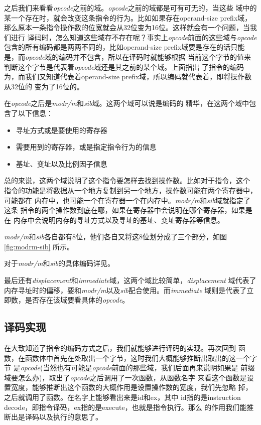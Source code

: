 之后我们来看看\emph{opcode}之前的域。\emph{opcode}之前的域都是可有可无的，当这些
域中的某一个存在时，就会改变这条指令的行为。比如如果存在operand-size prefix域，
那么原本一条指令操作数的位宽就会从32位变为16位。这样就会有一个问题，当我们进行
译码时，怎么知道这些域存不存在呢？事实上\emph{opcode}前面的这些域与\emph{opcode}
包含的所有编码都是两两不同的，比如operand-size prefix域要是存在的话只能
是，而\emph{opcode}域的编码并不包含，所以在译码时就能够根据
当前这个字节的值来判断这个字节是代表着\emph{opcode}域还是其之前的某个域。上面指出
了指令的编码为，而我们又知道代表着operand-size
prefix域，所以编码就代表着，即将操作数从32位的
变为了16位的。

在\emph{opcode}之后是\emph{modr/m}和\emph{sib}域。这两个域可以说是\arch 编码的
精华，在这两个域中包含了以下信息：
\begin{itemize}
  \item 寻址方式或是要使用的寄存器
  \item 需要用到的寄存器，或是指定指令行为的信息
  \item 基址、变址以及比例因子信息
\end{itemize}

总的来说，这两个域说明了这个指令要怎样去找到操作数。比如对于指令，这个
指令的功能是将数据从一个地方复制到另一个地方，操作数可能在两个寄存器中，可能都在
内存中，也可能一个在寄存器一个在内存中。\emph{modr/m}和\emph{sib}域就指定了这条
指令的两个操作数到底在哪，如果在寄存器中会说明在哪个寄存器，如果是在
内存中会说明内存的寻址方式以及寻址的基址、变址寄存器等信息。

\emph{modr/m}和\emph{sib}各自都有8位，他们各自又将这8位划分成了三个部分，如图\ref{fig:modrm-sib}
所示。


对于\emph{modr/m}和\emph{sib}的具体编码详见\cite{i386-manual}。

最后还有\emph{displacement}和\emph{immediate}域，这两个域比较简单，\emph{displacement}
域代表了内存寻址时的偏移，要和\emph{modr/m}以及\emph{sib}配合使用。而\emph{immediate}
域则是代表了立即数，是否存在该域要看具体的\emph{opcode}。

\subsection{\arch 译码实现}
在大致知道了\arch 指令的编码方式之后，我们就能够进行译码的实现。再次回到
函数，在函数体中首先在\pc 处取出一个字节，这时我们大概能够推断出取出的这一个字节
是\emph{opcode}(当然也有可能是\emph{opcode}前面的那些域，我们后面再来说明如果是
前缀域要怎么办)，取出了\emph{opcode}之后调用了一次函数，从函数名字
来看这个函数是设置宽度，能够推断出这个函数的大概作用是设置操作数的宽度，我们先忽略
掉，之后就调用了函数。在名字上能够看出来是id和ex，其中
id指的是instruction decode，即指令译码，ex指的是execute，也就是指令执行。那么
的作用我们能推断出是译码以及执行的意思了。

